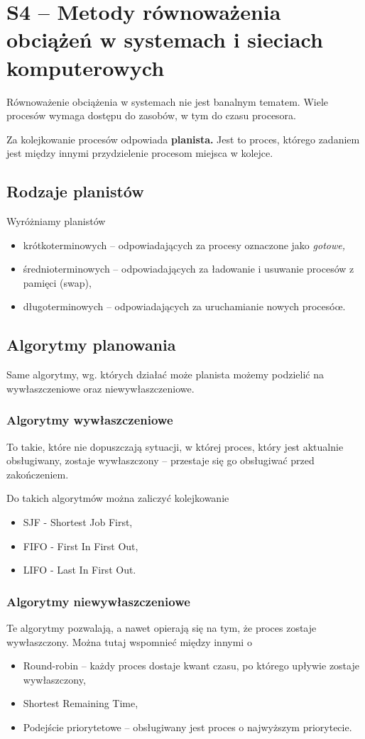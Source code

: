 \section{S4 -- Metody równoważenia obciążeń w systemach i sieciach komputerowych}

Równoważenie obciążenia w systemach nie jest banalnym tematem.
Wiele procesów wymaga dostępu do zasobów, w tym do czasu procesora.

Za kolejkowanie procesów odpowiada \textbf{planista.}
Jest to proces, którego zadaniem jest między innymi przydzielenie procesom miejsca w kolejce.

\subsection{Rodzaje planistów}
Wyróżniamy planistów
\begin{itemize}
	\item{krótkoterminowych -- odpowiadających za procesy oznaczone jako \textit{gotowe,}}
	\item{średnioterminowych -- odpowiadających za ładowanie i usuwanie procesów z pamięci (swap),}
	\item{długoterminowych -- odpowiadających za uruchamianie nowych procesóœ.}
\end{itemize}

\subsection{Algorytmy planowania}
Same algorytmy, wg. których działać może planista możemy podzielić na wywłaszczeniowe oraz niewywłaszczeniowe.

\subsubsection{Algorytmy wywłaszczeniowe}
To takie, które nie dopuszczają sytuacji, w której proces, który jest aktualnie obsługiwany, zostaje wywłaszczony -- przestaje się go obsługiwać przed zakończeniem.

Do takich algorytmów można zaliczyć kolejkowanie
\begin{itemize}
	\item{SJF - Shortest Job First,}
	\item{FIFO - First In First Out,}
	\item{LIFO - Last In First Out.}
\end{itemize}

\subsubsection{Algorytmy niewywłaszczeniowe}
Te algorytmy pozwalają, a nawet opierają się na tym, że proces zostaje wywłaszczony.
Można tutaj wspomnieć między innymi o
\begin{itemize}
	\item{Round-robin -- każdy proces dostaje kwant czasu, po którego upływie zostaje wywłaszczony,}
	\item{Shortest Remaining Time,}
	\item{Podejście priorytetowe -- obsługiwany jest proces o najwyższym priorytecie.}
\end{itemize}

